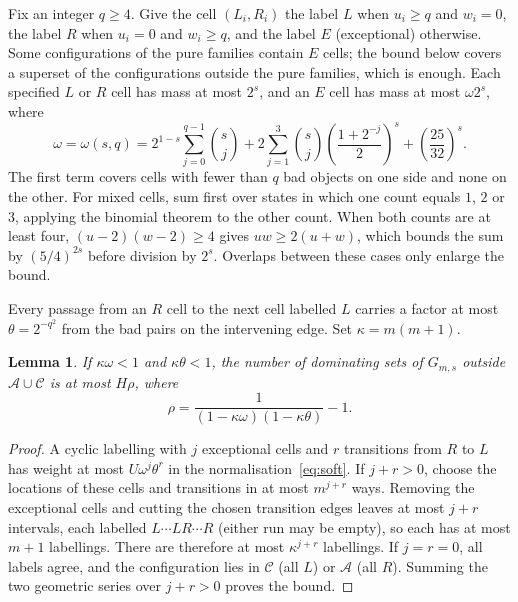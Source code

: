 \documentclass[11pt,a4paper]{article}
\newtheorem{lemma}[theorem]{Lemma}
\theoremstyle{definition}
\theoremstyle{remark}
\newcommand{\cA}{\mathcal A}
\newcommand{\cC}{\mathcal C}
\begin{document}
Fix an integer $q\ge4$. Give the cell $(L_i,R_i)$ the label $L$ when $u_i\ge q$ and $w_i=0$, the label $R$ when $u_i=0$ and $w_i\ge q$, and the label $E$ (exceptional) otherwise. Some configurations of the pure families contain $E$ cells; the bound below covers a superset of the configurations outside the pure families, which is enough. Each specified $L$ or $R$ cell has mass at most $2^s$, and an $E$ cell has mass at most $\omega2^s$, where
\begin{equation}\label{eq:e}
\omega=\omega(s,q)=
2^{1-s}\sum_{j=0}^{q-1}\binom{s}{j}
+2\sum_{j=1}^{3}\binom{s}{j}
\left(\frac{1+2^{-j}}{2}\right)^s
+\left(\frac{25}{32}\right)^s .
\end{equation}
The first term covers cells with fewer than $q$ bad objects on one side and none on the other. For mixed cells, sum first over states in which one count equals $1$, $2$ or $3$, applying the binomial theorem to the other count. When both counts are at least four, $(u-2)(w-2)\ge4$ gives $uw\ge2(u+w)$, which bounds the sum by $(5/4)^{2s}$ before division by $2^s$. Overlaps between these cases only enlarge the bound.

Every passage from an $R$ cell to the next cell labelled $L$ carries a factor at most $\theta=2^{-q^2}$ from the bad pairs on the intervening edge. Set $\kappa=m(m+1)$.

\begin{lemma}\label{lem:arc}
If $\kappa\omega<1$ and $\kappa\theta<1$, the number of dominating sets of $G_{m,s}$ outside $\cA\cup\cC$ is at most $H\rho$, where
\begin{equation}\label{eq:rho}
\rho=\frac{1}{(1-\kappa\omega)(1-\kappa\theta)}-1 .
\end{equation}
\end{lemma}
\begin{proof}
A cyclic labelling with $j$ exceptional cells and $r$ transitions from $R$ to $L$ has weight at most $U\omega^j\theta^r$ in the normalisation~\eqref{eq:soft}. If $j+r>0$, choose the locations of these cells and transitions in at most $m^{j+r}$ ways. Removing the exceptional cells and cutting the chosen transition edges leaves at most $j+r$ intervals, each labelled $L\cdots LR\cdots R$ (either run may be empty), so each has at most $m+1$ labellings. There are therefore at most $\kappa^{j+r}$ labellings. If $j=r=0$, all labels agree, and the configuration lies in $\cC$ (all $L$) or $\cA$ (all $R$). Summing the two geometric series over $j+r>0$ proves the bound.
\end{proof}
\end{document}
